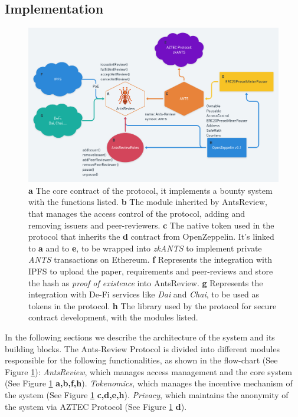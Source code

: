 \documentclass[runningheads]{llncs}
\begin{document}
\subsection{Implementation}

\begin{figure}
\centering
\includegraphics[scale=0.28]{AntsReview}
\caption{\textbf{a} The core contract of the protocol, it implements a bounty system with the functions listed.
\textbf{b} The module inherited by AntsReview, that manages the access control of the protocol, adding and removing issuers and peer-reviewers.
\textbf{c} The native token used in the protocol that inherits the \textbf{d} contract from OpenZeppelin. It's linked to \textbf{a} and to \textbf{e}, to be wrapped into \emph{zkANTS} to implement private \emph{ANTS} transactions on Ethereum.
\textbf{f} Represents the integration with IPFS to upload the paper, requirements and peer-reviews and store the hash as \emph{proof of existence} into AntsReview.
\textbf{g} Represents the integration with De-Fi services like \emph{Dai} and \emph{Chai}, to be used as tokens in the protocol.
\textbf{h} The library used by the protocol for secure contract development, with the modules listed.}
\label{fig:contracts}
\end{figure}

In the following sections we describe the architecture of the system and its building blocks.
\newline The Ants-Review Protocol is divided into different modules responsible for the following functionalities, as shown in the flow-chart (See Figure \ref{fig:contracts}):
\emph{AntsReview}, which manages access management and the core system (See Figure \ref{fig:contracts} \textbf{a,b,f,h}).
\emph{Tokenomics}, which manages the incentive mechanism of the system (See Figure \ref{fig:contracts} \textbf{c,d,e,h}).
\emph{Privacy}, which maintains the anonymity of the system via AZTEC Protocol (See Figure \ref{fig:contracts} \textbf{d}).
\end{document}
